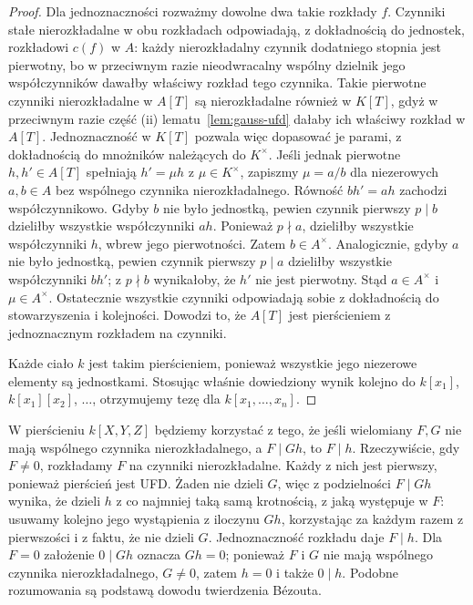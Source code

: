 \begin{proof}
Dla jednoznaczności rozważmy dowolne dwa takie rozkłady $f$.
Czynniki stałe nierozkładalne w obu rozkładach
odpowiadają, z dokładnością do jednostek, rozkładowi
$c(f)$ w $A$: każdy nierozkładalny czynnik dodatniego
stopnia jest pierwotny, bo w przeciwnym razie
nieodwracalny wspólny dzielnik jego współczynników
dawałby właściwy rozkład tego czynnika.
Takie pierwotne czynniki nierozkładalne w $A[T]$
są nierozkładalne również w $K[T]$, gdyż w przeciwnym
razie część (ii) lematu~\ref{lem:gauss-ufd} dałaby
ich właściwy rozkład w $A[T]$.
Jednoznaczność w $K[T]$ pozwala więc dopasować je parami,
z dokładnością do mnożników należących do $K^\times$.
Jeśli jednak pierwotne $h,h'\in A[T]$ spełniają
$h'=\mu h$ z $\mu\in K^\times$, zapiszmy $\mu=a/b$
dla niezerowych $a,b\in A$ bez wspólnego czynnika
nierozkładalnego. Równość $bh'=ah$ zachodzi
współczynnikowo. Gdyby $b$ nie było jednostką,
pewien czynnik pierwszy $p\mid b$ dzieliłby wszystkie
współczynniki $ah$. Ponieważ $p\nmid a$, dzieliłby
wszystkie współczynniki $h$, wbrew jego pierwotności.
Zatem $b\in A^\times$. Analogicznie, gdyby $a$ nie
było jednostką, pewien czynnik pierwszy $p\mid a$
dzieliłby wszystkie współczynniki $bh'$; z $p\nmid b$
wynikałoby, że $h'$ nie jest pierwotny. Stąd
$a\in A^\times$ i $\mu\in A^\times$.
Ostatecznie wszystkie czynniki odpowiadają sobie
z dokładnością do stowarzyszenia i kolejności.
Dowodzi to, że $A[T]$ jest pierścieniem
z jednoznacznym rozkładem na czynniki.

Każde ciało $k$ jest takim pierścieniem, ponieważ
wszystkie jego niezerowe elementy są jednostkami.
Stosując właśnie dowiedziony wynik kolejno do
$k[x_1]$, $k[x_1][x_2]$, $\dots$,
otrzymujemy tezę dla $k[x_1,\dots,x_n]$.
\end{proof}

\begin{uwaga}
W pierścieniu $k[X,Y,Z]$ będziemy korzystać z tego,
że jeśli wielomiany $F,G$ nie mają wspólnego czynnika
nierozkładalnego, a $F\mid Gh$, to $F\mid h$.
Rzeczywiście, gdy $F\ne0$, rozkładamy $F$ na czynniki
nierozkładalne. Każdy z nich jest pierwszy, ponieważ
pierścień jest UFD. Żaden nie dzieli $G$, więc z podzielności
$F\mid Gh$ wynika, że dzieli $h$ z co najmniej taką samą
krotnością, z jaką występuje w $F$: usuwamy kolejno jego
wystąpienia z iloczynu $Gh$, korzystając za każdym razem
z pierwszości i z faktu, że nie dzieli $G$.
Jednoznaczność rozkładu daje $F\mid h$.
Dla $F=0$ założenie $0\mid Gh$ oznacza $Gh=0$;
ponieważ $F$ i $G$ nie mają wspólnego czynnika
nierozkładalnego, $G\ne0$, zatem $h=0$ i także $0\mid h$.
Podobne rozumowania są podstawą dowodu twierdzenia Bézouta.
\end{uwaga}

